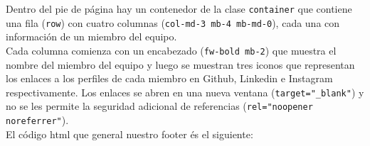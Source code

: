 \documentclass{article}
\begin{document}
\noindent Dentro del pie de página hay un contenedor de la clase \texttt{container} que contiene una fila (\texttt{row}) con cuatro columnas (\texttt{col-md-3 mb-4 mb-md-0}), cada una con información de un miembro del equipo.\\

\noindent Cada columna comienza con un encabezado (\texttt{fw-bold mb-2}) que muestra el nombre del miembro del equipo y luego se muestran tres iconos que representan los enlaces a los perfiles de cada miembro en Github, Linkedin e Instagram respectivamente. Los enlaces se abren en una nueva ventana (\texttt{target="\_blank"}) y no se les permite la seguridad adicional de referencias (\texttt{rel="noopener noreferrer"}).\\

\noindent El código html que general nuestro footer és el siguiente:
\end{document}
